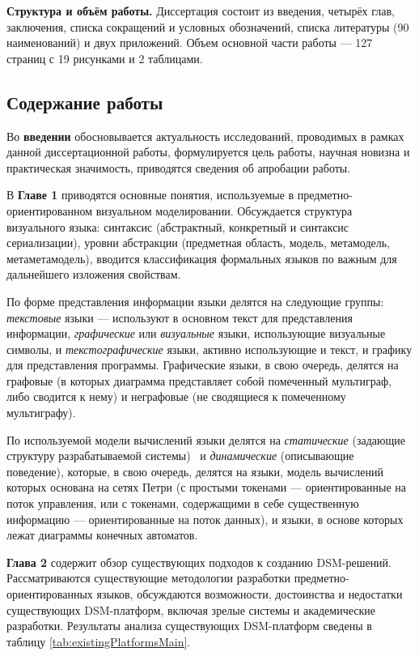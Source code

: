 \textbf{Структура и объём работы.} Диссертация состоит из введения, четырёх глав, заключения, 
списка сокращений и условных обозначений, списка литературы (90 наименований) и двух приложений. Объем основной 
части работы --- 127 страниц с 19 рисунками и 2 таблицами.

\subsection*{\Large Содержание работы}
Во \textbf{введении} обосновывается актуальность исследований, проводимых в рамках 
данной диссертационной работы, формулируется цель работы, научная новизна и практическая 
значимость, приводятся сведения об апробации работы.

В \textbf{Главе 1} приводятся основные понятия, используемые в 
предметно-ориентированном визуальном моделировании. Обсуждается структура 
визуального языка: синтаксис (абстрактный, конкретный и синтаксис сериализации), 
уровни абстракции (предметная область, модель, метамодель, метаметамодель), вводится 
классификация формальных языков по важным для дальнейшего изложения свойствам.

По форме представления информации языки делятся на следующие группы: \textit{текстовые} языки 
--- используют в основном текст для представления информации, \textit{графические} или 
\textit{визуальные} языки, использующие визуальные символы, и \textit{текстографические} языки,
активно использующие и текст, и графику для представления программы. Графические языки, в свою очередь, 
делятся на графовые (в которых диаграмма представляет собой помеченный мультиграф, либо сводится к нему)
и неграфовые (не сводящиеся к помеченному мультиграфу).

По используемой модели вычислений языки делятся на \textit{статические} (задающие структуру разрабатываемой системы) \
и \textit{динамические} (описывающие поведение), которые, в свою очередь, делятся на языки, 
модель вычислений которых основана на сетях Петри (с простыми токенами --- ориентированные на поток управления,
или с токенами, содержащими в себе существенную информацию --- ориентированные на поток данных),
и языки, в основе которых лежат диаграммы конечных автоматов.

\textbf{Глава 2} содержит обзор существующих подходов к созданию DSM-решений. 
Рассматриваются существующие методологии разработки предметно-ориентированных языков,
обсуждаются возможности, достоинства и недостатки существующих DSM-платформ, 
включая зрелые системы и академические разработки. Результаты анализа существующих 
DSM-платформ сведены в таблицу \ref{tab:existingPlatformsMain}.

